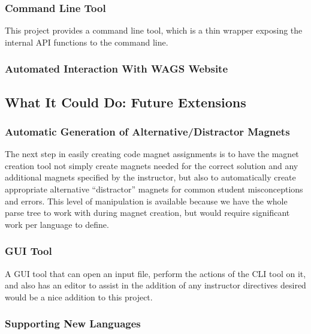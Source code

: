 \documentclass[letter,10pt]{article}
\begin{document}
\subsubsection{Command Line Tool}

This project provides a command line tool, which is a thin wrapper 
exposing the internal API functions to the command line.


\subsubsection{Automated Interaction With WAGS Website}



\subsection{What It Could Do: Future Extensions}

\subsubsection{Automatic Generation of Alternative/Distractor Magnets}

The next step in easily creating code magnet assignments is to have the 
magnet creation tool not simply create magnets needed for the correct 
solution and any additional magnets specified by the instructor, but 
also to automatically create appropriate alternative ``distractor'' 
magnets for common student misconceptions and errors. This level of 
manipulation is available because we have the whole parse tree to work 
with during magnet creation, but would require significant work per 
language to define.

\subsubsection{GUI Tool}

A GUI tool that can open an input file, perform the actions of the CLI 
tool on it, and also has an editor to assist in the addition of any 
instructor directives desired would be a nice addition to this project.

\subsubsection{Supporting New Languages}
\end{document}
